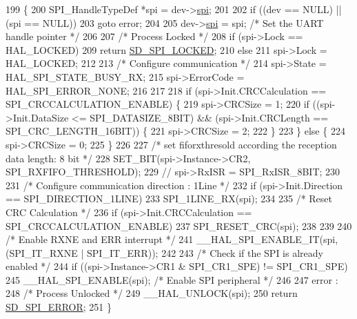 \begin{DoxyCode}
199 \{
200     SPI\_HandleTypeDef *spi = dev->\mbox{\hyperlink{structsd__spi__dev_a06909907ded69cbc00db1f401a90f8ee}{spi}};
201 
202     \textcolor{keywordflow}{if} ((dev == NULL) || (spi == NULL))
203         \textcolor{keywordflow}{goto} error;
204                         
205     dev->\mbox{\hyperlink{structsd__spi__dev_a06909907ded69cbc00db1f401a90f8ee}{spi}} = spi;       \textcolor{comment}{/* Set the UART handle pointer */}
206        
207     \textcolor{comment}{/* Process Locked */}            
208     \textcolor{keywordflow}{if} (spi->Lock == HAL\_LOCKED)
209         \textcolor{keywordflow}{return} \mbox{\hyperlink{group___s_d___s_p_i___types_gga9ae67f7089a8196e9c6b74b8a6708c2eaa7e23f729a2493076dfb261678471c24}{SD\_SPI\_LOCKED}};
210     \textcolor{keywordflow}{else}
211         spi->Lock = HAL\_LOCKED;
212 
213     \textcolor{comment}{/* Configure communication */}
214     spi->State       = HAL\_SPI\_STATE\_BUSY\_RX;
215     spi->ErrorCode   = HAL\_SPI\_ERROR\_NONE;
216 
217 
218     \textcolor{keywordflow}{if} (spi->Init.CRCCalculation == SPI\_CRCCALCULATION\_ENABLE) \{
219         spi->CRCSize = 1;
220         \textcolor{keywordflow}{if} ((spi->Init.DataSize <= SPI\_DATASIZE\_8BIT) && (spi->Init.CRCLength == SPI\_CRC\_LENGTH\_16BIT)) \{
221             spi->CRCSize = 2;
222         \}
223     \} \textcolor{keywordflow}{else} \{
224         spi->CRCSize = 0;
225     \}
226 
227     \textcolor{comment}{/* set fiforxthresold according the reception data length: 8 bit */}
228     SET\_BIT(spi->Instance->CR2, SPI\_RXFIFO\_THRESHOLD);
229 \textcolor{comment}{//  spi->RxISR = SPI\_RxISR\_8BIT;}
230 
231     \textcolor{comment}{/* Configure communication direction : 1Line */}
232     \textcolor{keywordflow}{if} (spi->Init.Direction == SPI\_DIRECTION\_1LINE)
233         SPI\_1LINE\_RX(spi);
234 
235     \textcolor{comment}{/* Reset CRC Calculation */}
236     \textcolor{keywordflow}{if} (spi->Init.CRCCalculation == SPI\_CRCCALCULATION\_ENABLE)
237         SPI\_RESET\_CRC(spi);
238     
239 
240     \textcolor{comment}{/* Enable RXNE and ERR interrupt */}
241     \_\_HAL\_SPI\_ENABLE\_IT(spi, (SPI\_IT\_RXNE | SPI\_IT\_ERR));
242 
243     \textcolor{comment}{/* Check if the SPI is already enabled */}
244     \textcolor{keywordflow}{if} ((spi->Instance->CR1 & SPI\_CR1\_SPE) != SPI\_CR1\_SPE)
245         \_\_HAL\_SPI\_ENABLE(spi);         \textcolor{comment}{/* Enable SPI peripheral */}
246 
247     error :
248         \textcolor{comment}{/* Process Unlocked */}
249         \_\_HAL\_UNLOCK(spi);
250         \textcolor{keywordflow}{return} \mbox{\hyperlink{group___s_d___s_p_i___types_gga9ae67f7089a8196e9c6b74b8a6708c2eae8bfc341906b1dcb2431a61007acd4f0}{SD\_SPI\_ERROR}};
251 \}
\end{DoxyCode}
\mbox{\label{group___s_d___s_p_i___functions_ga8f8403c9f68c9a623486a29cf8715fda}} 

